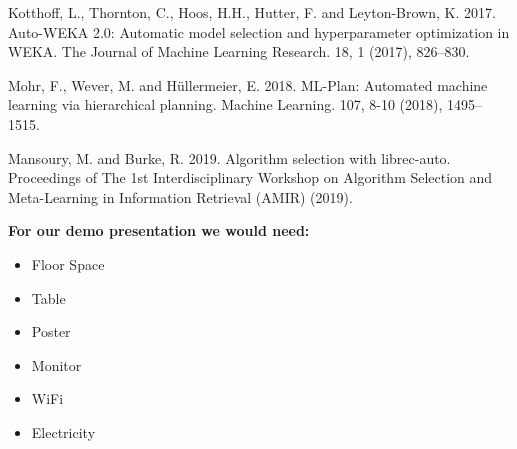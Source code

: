 \documentclass{article}
\begin{document}
\begin{thebibliography}{9}
Kotthoff, L., Thornton, C., Hoos, H.H., Hutter, F. and Leyton-Brown, K. 2017. Auto-WEKA 2.0: Automatic model selection and hyperparameter optimization in WEKA. The Journal of Machine Learning Research. 18, 1 (2017), 826–830.

Mohr, F., Wever, M. and Hüllermeier, E. 2018. ML-Plan: Automated machine learning via hierarchical planning. Machine Learning. 107, 8-10 (2018), 1495–1515.

Mansoury, M. and Burke, R. 2019. Algorithm selection with librec-auto. Proceedings of The 1st Interdisciplinary Workshop on Algorithm Selection and Meta-Learning in Information Retrieval (AMIR) (2019).

\end{thebibliography}




\newpage
\textbf{For our demo presentation we would need:}
\begin{itemize}
  \item Floor Space
  \item Table
  \item Poster
  \item Monitor
  \item WiFi
  \item Electricity 
\end{itemize}
\end{document}
